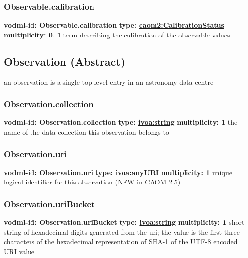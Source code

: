     \subsubsection{Observable.calibration}
      \textbf{vodml-id: Observable.calibration} \newline
      \textbf{type: \hyperref[sect:CalibrationStatus]{caom2:CalibrationStatus}} \newline
      \textbf{multiplicity: 0..1} \newline
      term describing the calibration of the observable values

  \subsection{Observation (Abstract)}
  \label{sect:Observation}
    an observation is a single top-level entry in an astronomy data centre

    \subsubsection{Observation.collection}
      \textbf{vodml-id: Observation.collection} \newline
      \textbf{type: \hyperref[sect:ivoa]{ivoa:string}} \newline
      \textbf{multiplicity: 1} \newline
      the name of the data collection this observation belongs to

    \subsubsection{Observation.uri}
      \textbf{vodml-id: Observation.uri} \newline
      \textbf{type: \hyperref[sect:ivoa]{ivoa:anyURI}} \newline
      \textbf{multiplicity: 1} \newline
      unique logical identifier for this observation (NEW in CAOM-2.5)

    \subsubsection{Observation.uriBucket}
      \textbf{vodml-id: Observation.uriBucket} \newline
      \textbf{type: \hyperref[sect:ivoa]{ivoa:string}} \newline
      \textbf{multiplicity: 1} \newline
      short string of hexadecimal digits generated from the uri; the value is the first three characters of the hexadecimal representation of SHA-1 of the UTF-8 encoded URI value


